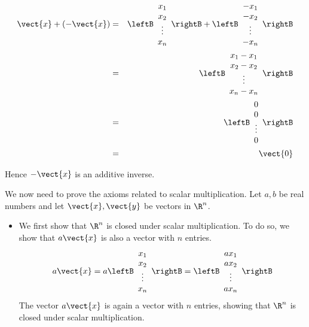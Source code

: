 \begin{solution}
\begin{itemize}
\begin{eqnarray*}
\vect{x} + \left( -\vect{x} \right) &=& 
 \leftB \begin{array}{c}
x_1 \\
x_2 \\
\vdots \\
x_n
\end{array}\rightB + \leftB \begin{array}{c}
-x_1 \\
-x_2 \\
\vdots \\
-x_n
\end{array}\rightB \\
&=& \leftB \begin{array}{c}
x_1-x_1 \\
x_2-x_2 \\
\vdots \\
x_n-x_n
\end{array}\rightB \\
&=& \leftB \begin{array}{c}
0\\
0 \\
\vdots \\
0
\end{array}\rightB \\
&=& \vect{0}
\end{eqnarray*}

Hence $-\vect{x}$ is an additive inverse. 
\end{itemize}

We now need to prove the axioms related to scalar multiplication. Let $a,b$ be real numbers and let $\vect{x}, \vect{y}$ be vectors in $\R^n$. 

\begin{itemize}
\item
We first show that $\R^n$ is closed under scalar multiplication. To do so, we show that $a\vect{x}$ is also a vector with $n$ entries. 
\[
a\vect{x} = a\leftB 
\begin{array}{c}
x_1 \\
x_2 \\
\vdots \\
x_n 
\end{array} \rightB 
=
\leftB 
\begin{array}{c}
ax_1 \\
ax_2 \\
\vdots \\
ax_n 
\end{array} \rightB
\]
The vector $a\vect{x}$ is again a vector with $n$ entries, showing that $\R^n$ is closed under scalar multiplication. 



\end{itemize}
\end{solution}
